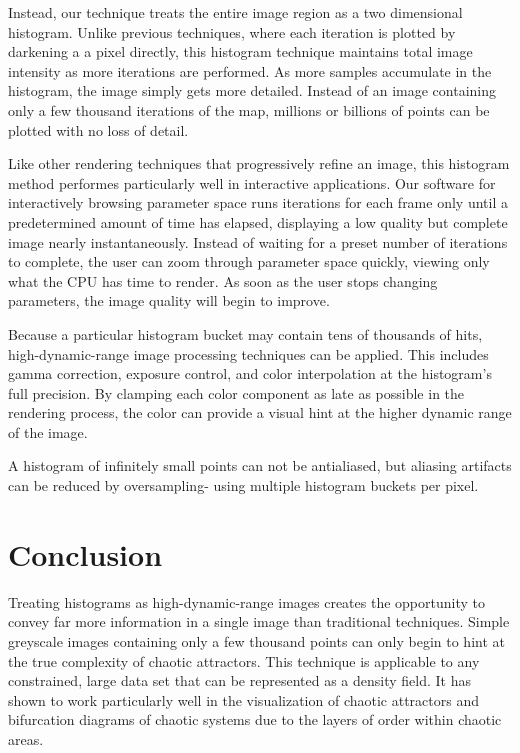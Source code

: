 \documentclass{acmsiggraph}
\begin{document}
Instead, our technique treats the entire image region as a two dimensional
histogram. Unlike previous techniques, where each iteration is plotted by
darkening a a pixel directly, this histogram technique maintains total image
intensity as more iterations are performed. As more samples accumulate in the
histogram, the image simply gets more detailed. Instead of an image containing
only a few thousand iterations of the map, millions or billions of points can
be plotted with no loss of detail.

Like other rendering techniques that progressively refine an image, this
histogram method performes particularly well in interactive applications.
Our software for interactively browsing parameter space runs iterations
for each frame only until a predetermined amount of time has elapsed,
displaying a low quality but complete image nearly instantaneously.
Instead of waiting for a preset number of iterations to complete, the user
can zoom through parameter space quickly, viewing only what the CPU has time
to render. As soon as the user stops changing parameters, the image quality
will begin to improve.

Because a particular histogram bucket may contain tens of thousands of hits,
high-dynamic-range image processing techniques can be applied. This includes
gamma correction, exposure control, and color interpolation at the histogram's
full precision. By clamping each color component as late as possible in the
rendering process, the color can provide a visual hint at the higher
dynamic range of the image.

A histogram of infinitely small points can not be antialiased, but aliasing
artifacts can be reduced by oversampling- using multiple histogram buckets
per pixel.

\section{Conclusion}
Treating histograms as high-dynamic-range images creates the opportunity to
convey far more information in a single image than traditional techniques.
Simple greyscale images containing only a few thousand points can only begin
to hint at the true complexity of chaotic attractors. This technique is
applicable to any constrained, large data set that can be represented as a
density field. It has shown to work particularly well in the visualization
of chaotic attractors and bifurcation diagrams of chaotic systems due to
the layers of order within chaotic areas.
\end{document}

